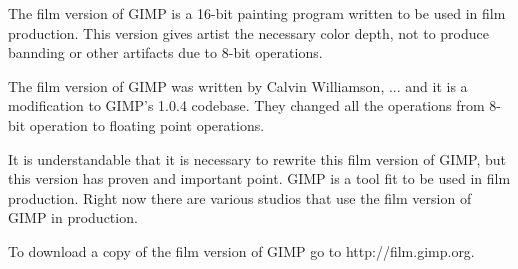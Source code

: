 The film version of GIMP is a 16-bit painting program written to be used in film production. This version gives artist the necessary color depth, not to produce bannding or other artifacts due to 8-bit operations.  

The film version of GIMP was written by Calvin Williamson, ... and it is a modification to GIMP's 1.0.4 codebase. They changed all the operations from 8-bit operation to floating point operations. 

It is understandable that it is necessary to rewrite this film version of GIMP, but this version has proven and important point. GIMP is a tool fit to be used in film production. Right now there are various studios that use the film version of GIMP in production. 

To download a copy of the film version of GIMP go to http://film.gimp.org.

